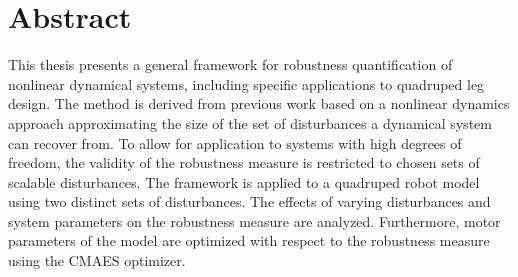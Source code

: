 \chapter*{Abstract}

\iffalse
This work
general framework 
robustness quantification 
systes with high dof
optimization

derived from nonlinear dynamics approach 
previous method adapted for feasibility

analysis of behaviour of systems under different disturbances
analysis of effect of system parameters on robustness measure
optimization of parameters to in two "primitive" (i.e. simple) tests
\fi

This thesis presents a general framework for robustness quantification of nonlinear dynamical systems, including specific applications to quadruped leg design. The method is derived from previous work based on a nonlinear dynamics approach approximating the size of the set of disturbances a dynamical system can recover from. To allow for application to systems with high degrees of freedom, the validity of the robustness measure is restricted to chosen sets of scalable disturbances. The framework is applied to a quadruped robot model using two distinct sets of disturbances. The effects of varying disturbances and system parameters on the robustness measure are analyzed. Furthermore, motor parameters of the model are optimized with respect to the robustness measure using the CMAES optimizer. 

\iffalse
 Restrictions from a general robustness measure to robustness with respect to specific disturbances were made allow for application to systems with high degrees of freedom. 
\fi


\cleardoublepage
